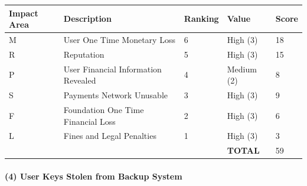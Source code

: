 \documentclass[a4paper,12pt]{article} %
\begin{document}
{\begin{center}
\begin{tabular}{ | l | l | l | l | l |}
  \hline
  \textbf{Impact Area} & \textbf{Description} & \textbf{Ranking} & \textbf{Value} & \textbf{Score}
  \\ \hline
  M & User One Time Monetary Loss			& 6	& High (3)		& 18
  \\ \hline
  R & Reputation		& 5	& High (3)		& 15
  \\ \hline
  P & User Financial Information Revealed		& 4	& Medium (2)	& 8
  \\ \hline
  S & Payments Network Unusable					& 3	& High (3)		& 9
  \\ \hline
  F & Foundation One Time Financial Loss	& 2	& High (3)		& 6
  \\ \hline
  L & Fines and Legal Penalties						& 1	& High (3)		& 3
  \\ \hline
  & & & \textbf{TOTAL} & 59
  \\ \hline
\end{tabular}
\end{center}
\label{tab:severitySpoofIdToAddressLookup}

\paragraph{(4) User Keys Stolen from Backup System }

}
\end{document}
